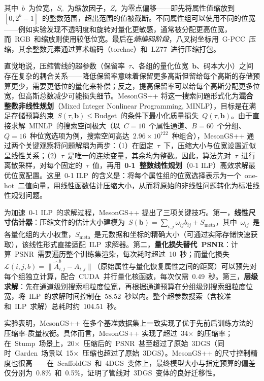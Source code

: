 其中~$b$~为位宽，$S_c$~为缩放因子，$Z_c$~为零点偏移——即先将属性值缩放到~$[0, 2^b{-}1]$~的整数范围，超出范围的值被截断。不同属性组可以使用不同的位宽——例如实验发现不透明度和旋转对量化更敏感，通常被分配更高位宽，而~RGB~和缩放则使用较低位宽。最后在\emph{熵编码阶段}，八叉树坐标用~G-PCC~压缩，其余整数元素通过算术编码（torchac）和~LZ77~进行压缩打包。

直觉地说，压缩管线的超参数（保留率~$\tau$、各组的量化位宽~$\mathbf{b}$、码本大小）之间存在复杂的耦合关系——降低保留率意味着保留更多高斯但留给每个高斯的存储预算更少，需要更低位的量化来补偿；反之，提高保留率可以给每个高斯分配更多位宽，但高斯总数减少可能损失细节。MesonGS++ 将这一搜索问题形式化为\textbf{混合整数非线性规划}（Mixed Integer Nonlinear Programming, MINLP），目标是在满足存储预算约束~$S(\tau, \mathbf{b}) \leq \text{Budget}$~的条件下最小化质量损失~$Q(\tau, \mathbf{b})$。由于直接求解~MINLP~的搜索空间极大（以~$C{=}10$~个属性通道、$B{=}60$~个分组、$Q{=}16$~种位宽选项为例，搜索空间高达~$2.96 \times 10^{722}$~种组合），MesonGS++ 通过两个关键观察将问题解耦为两步：（1）在固定~$\tau$~下，压缩大小与位宽设置近似呈线性关系；（2）$\tau$~是唯一的连续变量，其余均为整数。因此，算法先对~$\tau$~进行离散采样，对每个固定的~$\tau$~值，再用~\textbf{0-1~整数线性规划}（0-1 ILP）高效求解最优位宽配置。这里~0-1 ILP~的含义是：将每个属性组的位宽选择表示为一个~one-hot~二值向量，用线性函数估计压缩大小，从而将原始的非线性问题转化为标准线性规划问题。

为加速~0-1 ILP~的求解过程，MesonGS++ 提出了三项关键技巧。第一，\textbf{线性尺寸估计器}：压缩文件的估计大小建模为~$S(\mathbf{b}) = \sum_{i,j} \omega_{ij} b_{ij} + S_\text{meta}$，其中~$\omega_{ij}$~是各量化组的大小权重，$S_\text{meta}$~是元数据和坐标的精确大小（可通过实际存储快速获取），该线性形式直接适配~ILP~求解器。第二，\textbf{量化损失替代~PSNR}：计算~PSNR~需要遍历整个训练集渲染，每次耗时超过~10~秒；而量化损失~$\mathcal{L}(i,j,b) = \| \hat{A}_{i,j}^b - A_{i,j} \|$（原始属性与量化恢复属性之间的距离）可以预先对每个组独立计算，配合~CUDA~并行量化核函数，每次仅需~0.49~秒。第三，\textbf{层级求解}：先在通道级别搜索粗粒度位宽，再根据通道预算在分组级别搜索细粒度位宽，将~ILP~的求解时间控制在~58.52~秒以内。整个超参数搜索（含校准和~ILP~求解）总耗时约~104.51~秒。

实验表明，MesonGS++ 在多个基准数据集上一致实现了优于先前后训练方法的压缩率-质量权衡。具体而言，MesonGS++ 实现了超过~34$\times$~的压缩率；在~Stump~场景上，20$\times$~压缩后的~PSNR~甚至超过了原始~3DGS（同时~Garden~场景以~15$\times$~压缩也超过了原始~3DGS）。MesonGS++ 的尺寸控制精度也很高——在~ScaffoldGS~和~4DGS~变体上，最终模型大小与指定预算的偏差仅分别为~0.8\%~和~0.5\%，证明了管线对~3DGS~变体的良好迁移性。

